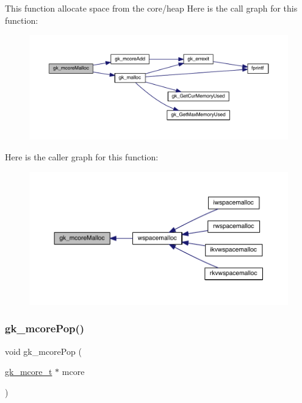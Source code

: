 This function allocate space from the core/heap Here is the call graph for this function\+:\nopagebreak
\begin{figure}[H]
\begin{center}
\leavevmode
\includegraphics[width=350pt]{a00077_ab7a380f0696a0d5421653fad336bcae0_cgraph}
\end{center}
\end{figure}
Here is the caller graph for this function\+:\nopagebreak
\begin{figure}[H]
\begin{center}
\leavevmode
\includegraphics[width=350pt]{a00077_ab7a380f0696a0d5421653fad336bcae0_icgraph}
\end{center}
\end{figure}
\mbox{\label{a00077_ac7b3189a2be11b6736dc4c27d3d30f3a}} 
\subsubsection{\texorpdfstring{gk\+\_\+mcore\+Pop()}{gk\_mcorePop()}}
{\footnotesize\ttfamily void gk\+\_\+mcore\+Pop (\begin{DoxyParamCaption}\item[{\hyperlink{a00682}{gk\+\_\+mcore\+\_\+t} $\ast$}]{mcore }\end{DoxyParamCaption})}

